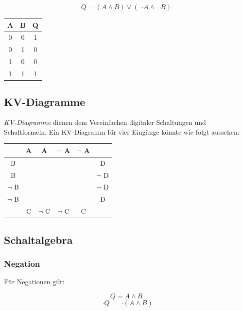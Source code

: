 \documentclass[a4paper, 12pt]{report}
\begin{document}
\begin{multicols}{2}
\begin{center}
	\begin{equation}
		Q = (A \land B) \lor (\neg A \land \neg B)
	\end{equation}
   \begin{tabular}{ | c | c || c | }
    	\hline
    	A & B & Q \\ \hline
    	0 & 0 & 1 \\ \hline
    	0 & 1 & 0 \\ \hline
    	1 & 0 & 0 \\ \hline
    	1 & 1 & 1 \\
    	\hline
    \end{tabular}
\end{center}

\subsection{KV-Diagramme}

\emph{KV-Diagramme} dienen dem Vereinfachen digitaler Schaltungen und
Schaltformeln. Ein KV-Diagramm für vier Eingänge könnte wie folgt aussehen:

\begin{center}
    \begin{tabular}{ | c | c | c | c | c | c | }
	\hline
	 & A & A & $\neg$ A & $\neg$ A &  \\ \hline
	B & & & & & D \\ \hline
	B & & & & & $\neg$ D \\ \hline
	$\neg$ B & & & & & $\neg$ D \\ \hline
	$\neg$ B & & & & & D \\ \hline
	 & C & $\neg$ C & $\neg$ C & C &  \\
	\hline
    \end{tabular}
\end{center}


\subsection{Schaltalgebra}

\subsubsection{Negation}

Für Negationen gilt:

\begin{center}
    \begin{equation}
	Q = A \land B
    \end{equation}
    \begin{equation}
	\neg Q = \neg (A \land B)
    \end{equation}
\end{center}


\end{multicols}
\end{document}
